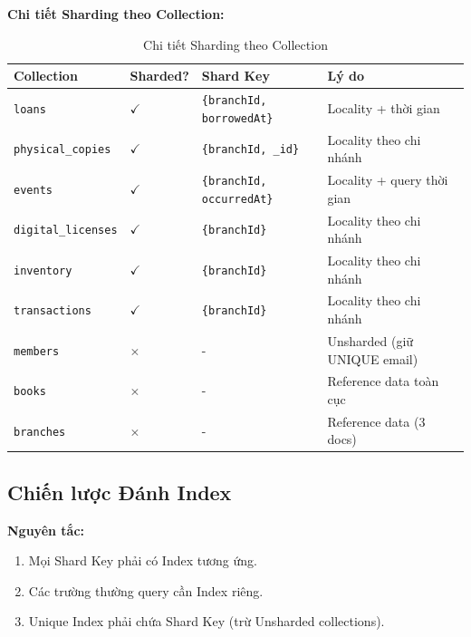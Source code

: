 \documentclass[a4paper,12pt]{article}
\begin{document}
\textbf{Chi tiết Sharding theo Collection:}
\begin{table}[H]
\centering
\begin{tabularx}{\textwidth}{|l|l|l|X|}
\hline
\textbf{Collection} & \textbf{Sharded?} & \textbf{Shard Key} & \textbf{Lý do} \\
\hline
\texttt{loans} & $\checkmark$ & \texttt{\{branchId, borrowedAt\}} & Locality + thời gian \\
\hline
\texttt{physical\_copies} & $\checkmark$ & \texttt{\{branchId, \_id\}} & Locality theo chi nhánh \\
\hline
\texttt{events} & $\checkmark$ & \texttt{\{branchId, occurredAt\}} & Locality + query thời gian \\
\hline
\texttt{digital\_licenses} & $\checkmark$ & \texttt{\{branchId\}} & Locality theo chi nhánh \\
\hline
\texttt{inventory} & $\checkmark$ & \texttt{\{branchId\}} & Locality theo chi nhánh \\
\hline
\texttt{transactions} & $\checkmark$ & \texttt{\{branchId\}} & Locality theo chi nhánh \\
\hline
\texttt{members} & $\times$ & - & Unsharded (giữ UNIQUE email) \\
\hline
\texttt{books} & $\times$ & - & Reference data toàn cục \\
\hline
\texttt{branches} & $\times$ & - & Reference data (3 docs) \\
\hline
\end{tabularx}
\caption{Chi tiết Sharding theo Collection}
\end{table}

\subsection{Chiến lược Đánh Index}
\textbf{Nguyên tắc:}
\begin{enumerate}
    \item Mọi Shard Key phải có Index tương ứng.
    \item Các trường thường query cần Index riêng.
    \item Unique Index phải chứa Shard Key (trừ Unsharded collections).
\end{enumerate}
\end{document}
